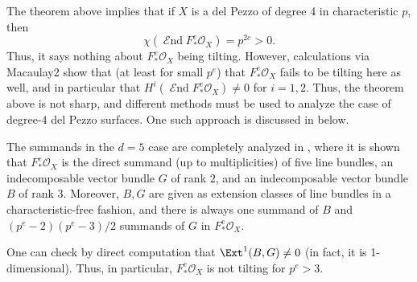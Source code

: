 \documentclass{article}
\def\O{\mathcal O}
\numberwithin{equation}{section}
\theoremstyle{theorem}
\numberwithin{thm}{section}
\theoremstyle{definition}
\DeclareMathOperator{\SEnd}{\mathcal{E}nd}
\begin{document}
\begin{rem}[$d=4$]
The theorem above implies that if $X$ is a del Pezzo of degree 4 in characteristic $p$, then
$$
\chi(\SEnd F_*^e \O_X) = p^{2e}>0.
$$
Thus, it says nothing about $F_*^e\O_X$ being tilting. 
However, calculations via Macaulay2 \cite{M2} show that (at least for small $p^e$) that $F_*^e\O_X$ fails to be tilting here as well, and in particular that $H^i(\SEnd F_*^e \O_X)\neq 0$ for $i=1,2$. Thus, the theorem above is not sharp, and different methods must be used to analyze the case of degree-4 del Pezzo surfaces. One such approach is discussed in  below.
\end{rem}

\begin{rem}[$d=5$]
\label{remHara}
The summands in the $d=5$ case are completely analyzed in \cite{Hara1}, where it is shown that $F_*^e\O_X$ is the direct summand (up to multiplicities) of five line bundles, an indecomposable vector bundle $G$ of rank $2$, and an indecomposable vector bundle $B$ of rank 3.
Moreover, $B,G$ are given as extension classes of line bundles in a characteristic-free fashion, and there is always one summand of $B$ and $(p^e-2)(p^e-3)/2$ summands of $G$ in $F_*^e\O_X$.

One can check by direct computation that $\Ext^1(B,G)\neq 0$ (in fact, it is 1-dimensional). Thus, in particular, $F_*^e\O_X$ is not tilting for $p^e> 3$.
\end{rem}
\end{document}
